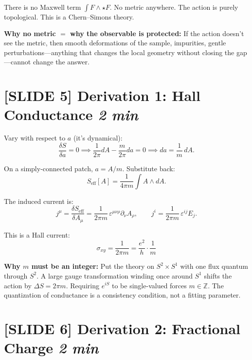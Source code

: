 \documentclass[11pt]{article}
\begin{document}
There is no Maxwell term $\int F \wedge \star F$. No metric anywhere. The action is purely topological. This is a Chern--Simons theory.

\textbf{Why no metric $=$ why the observable is protected:} If the action doesn't see the metric, then smooth deformations of the sample, impurities, gentle perturbations---anything that changes the local geometry without closing the gap---cannot change the answer.

\section{[SLIDE 5] Derivation 1: Hall Conductance \hfill \normalfont\textit{2 min}}

Vary with respect to $a$ (it's dynamical):
\begin{equation}
\frac{\delta S}{\delta a} = 0 \implies \frac{1}{2\pi} dA - \frac{m}{2\pi} da = 0 \implies da = \frac{1}{m}\,dA.
\end{equation}

On a simply-connected patch, $a = A/m$. Substitute back:
\begin{equation}
S_{\mathrm{eff}}[A] = \frac{1}{4\pi m} \int A \wedge dA.
\end{equation}

The induced current is:
\begin{equation}
j^\mu = \frac{\delta S_{\mathrm{eff}}}{\delta A_\mu} = \frac{1}{2\pi m}\,\varepsilon^{\mu\nu\rho}\partial_\nu A_\rho, \qquad j^i = \frac{1}{2\pi m}\,\varepsilon^{ij}E_j.
\end{equation}

This is a Hall current:
\begin{equation}
\boxed{\sigma_{xy} = \frac{1}{2\pi m} = \frac{e^2}{h}\cdot\frac{1}{m}}
\end{equation}

\textbf{Why $m$ must be an integer:} Put the theory on $S^2 \times S^1$ with one flux quantum through $S^2$. A large gauge transformation winding once around $S^1$ shifts the action by $\Delta S = 2\pi m$. Requiring $e^{iS}$ to be single-valued forces $m \in \mathbb{Z}$. The quantization of conductance is a consistency condition, not a fitting parameter.

\section{[SLIDE 6] Derivation 2: Fractional Charge \hfill \normalfont\textit{2 min}}
\end{document}
